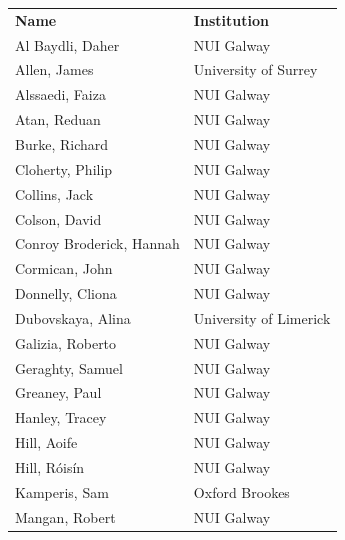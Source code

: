 \documentclass[a4paper, 11pt]{article}
\begin{document}
\begin{small}
\begin{minipage}[t]{0.45\textwidth}
\begin{tabular}{l l}
\textbf{Name}&\textbf{Institution}\\
  Al Baydli, Daher &	NUI Galway \\
  Allen, James & University of Surrey \\
  Alssaedi, Faiza &	NUI Galway \\
  Atan,  	Reduan &	NUI Galway \\
  Burke, 	Richard &	NUI Galway \\	
  Cloherty, 	Philip &	NUI Galway \\	
  Collins,  	Jack &	NUI Galway \\
                       Colson, 	David &	NUI Galway \\	
  Conroy Broderick, 	Hannah & NUI Galway \\	
Cormican,	John &	NUI Galway \\	
Donnelly,	Cliona &	NUI Galway \\	
Dubovskaya,	Alina &	University of Limerick \\ 
Galizia,	Roberto   &	NUI Galway\\	
Geraghty,	Samuel &	NUI Galway \\	
Greaney,	Paul &	NUI Galway \\	
  Hanley, Tracey & NUI Galway\\
  Hill, Aoife&	NUI Galway \\	
Hill, R\'ois\'in &	NUI Galway \\	
Kamperis, Sam &	Oxford Brookes\\
Mangan, Robert &	NUI Galway\\
\end{tabular}
\end{minipage} 
%
\begin{minipage}[t]{0.1\textwidth}

~



\end{minipage}
\end{small}
\end{document}
